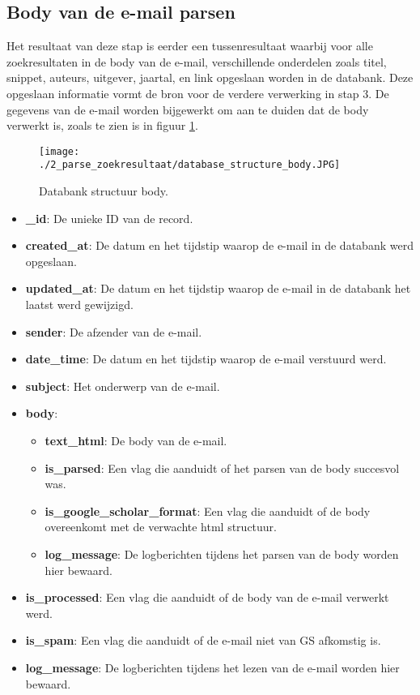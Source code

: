 \subsection{Body van de e-mail parsen}
Het resultaat van deze stap is eerder een tussenresultaat waarbij voor alle zoekresultaten in de body van de e-mail, verschillende onderdelen zoals titel, snippet, auteurs, uitgever, jaartal, en link opgeslaan worden in de databank. Deze opgeslaan informatie vormt de bron voor de verdere verwerking in stap 3.
De gegevens van de e-mail worden bijgewerkt om aan te duiden dat de body verwerkt is, zoals te zien is in figuur \ref{fig:databank_structuur_body}.
\begin{figure}[h!]
    \centering
    \texttt{[image: ./2\_parse\_zoekresultaat/database\_structure\_body.JPG]}
    \caption[Databank structuur body.]{\label{fig:databank_structuur_body}Databank structuur body.}
\end{figure}
\begin{itemize}
    \item \textbf{\_id}: De unieke ID van de record.
    \item \textbf{created\_at}: De datum en het tijdstip waarop de e-mail in de databank werd opgeslaan.
    \item \textbf{updated\_at}: De datum en het tijdstip waarop de e-mail in de databank het laatst werd gewijzigd. 
    \item \textbf{sender}: De afzender van de e-mail.
    \item \textbf{date\_time}: De datum en het tijdstip waarop de e-mail verstuurd werd.
    \item \textbf{subject}: Het onderwerp van de e-mail. 
    \item \textbf{body}: 
    \begin{itemize}
        \item \textbf{text\_html}: De body van de e-mail.
        \item \textbf{is\_parsed}: Een vlag die aanduidt of het parsen van de body succesvol was.
        \item \textbf{is\_google\_scholar\_format}: Een vlag die aanduidt of de body overeenkomt met de verwachte html structuur.
        \item \textbf{log\_message}: De logberichten tijdens het parsen van de body worden hier bewaard.
    \end{itemize}
    \item \textbf{is\_processed}: Een vlag die aanduidt of de body van de e-mail verwerkt werd.
    \item \textbf{is\_spam}: Een vlag die aanduidt of de e-mail niet van GS afkomstig is. 
    \item \textbf{log\_message}: De logberichten tijdens het lezen van de e-mail worden hier bewaard. 
\end{itemize}
